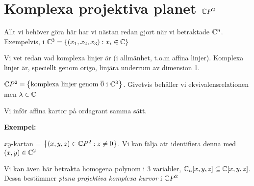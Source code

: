 \section{Komplexa projektiva planet $\mathbb{C} P^2$}\par
\noindent Allt vi behöver göra här har vi nästan redan gjort när vi betraktade $\mathbb{C}^n$. Exempelvis, i $\mathbb{C}^3 = \left\{(x_1,x_2,x_3):x_i\in\mathbb{C}\right\}$\par
\noindent Vi vet redan vad komplexa linjer är (i allmänhet, t.o.m affina linjer). Komplexa linjer är, speciellt genom origo, linjära underrum av dimension 1.
\par\bigskip
\noindent $\mathbb{C} P^2  = \left\{\text{komplexa linjer genom }\overline{0}\text{ i }\mathbb{C}^3\right\}$. Givetvis behåller vi ekvivalensrelationen men $\lambda\in\mathbb{C}$
\par\bigskip
\noindent Vi inför affina kartor på ordagrant samma sätt. 
\par\bigskip
\noindent\textbf{Exempel:}\par
\noindent $xy$-kartan = $\left\{(x,y,z)\in\mathbb{C} P^2:z\neq0\right\}$. Vi kan fälja att identifiera denna med $(x,y)\in\mathbb{C}^2$
\par\bigskip
\noindent Vi kan även här betrakta homogena polynom i 3 variabler, $\mathbb{C}_h[x,y,z] \subseteq \mathbb{C}[x,y,z]$. Dessa bestämmer \textit{plana projektiva komplexa kurvor} i $\mathbb{C} P^2$
\par\bigskip
